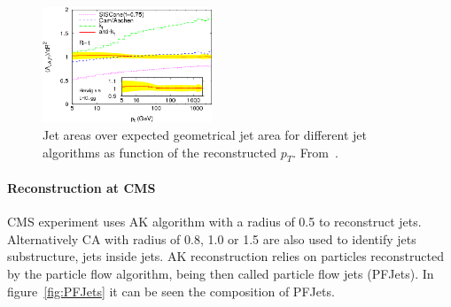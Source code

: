 \begin{figure}[!Hhtbp]
  \begin{center}
    \includegraphics[width=0.45\textwidth]{figs/JetArea.png}
    \caption{Jet areas over expected geometrical jet area for different jet algorithms as function of the reconstructed $p_{T}$. From~\cite{Cacciari:2008gp}.}
    \label{fig:JetsAlgosArea}
  \end{center}
\end{figure}

\paragraph{Reconstruction at CMS}

CMS experiment uses AK algorithm with a radius of 0.5 to reconstruct jets. Alternatively CA with radius of 0.8, 1.0 or 1.5 are also used to identify jets substructure, jets inside jets. AK reconstruction relies on particles reconstructed by the particle flow algorithm, being then called particle flow jets (PFJets). In figure~\ref{fig:PFJets} it can be seen the composition of PFJets.  

